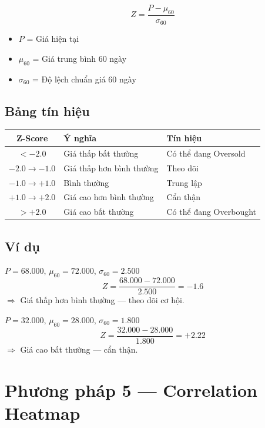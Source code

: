 \documentclass[12pt,a4paper]{article}
\begin{document}
\begin{equation}
\boxed{
  Z = \frac{P - \mu_{60}}{\sigma_{60}}
}
\end{equation}

\begin{itemize}[nosep]
  \item $P$ = Giá hiện tại
  \item $\mu_{60}$ = Giá trung bình 60 ngày
  \item $\sigma_{60}$ = Độ lệch chuẩn giá 60 ngày
\end{itemize}

\subsection{Bảng tín hiệu}

\begin{tabularx}{\textwidth}{c l l}
\toprule
\textbf{Z-Score} & \textbf{Ý nghĩa} & \textbf{Tín hiệu} \\
\midrule
$< -2.0$ & Giá thấp bất thường & Có thể đang Oversold \\
$-2.0 \to -1.0$ & Giá thấp hơn bình thường & Theo dõi \\
$-1.0 \to +1.0$ & Bình thường & Trung lập \\
$+1.0 \to +2.0$ & Giá cao hơn bình thường & Cẩn thận \\
$> +2.0$ & Giá cao bất thường & Có thể đang Overbought \\
\bottomrule
\end{tabularx}

\subsection{Ví dụ}

\begin{examplebox}[VNM]
$P = 68.000$, $\mu_{60} = 72.000$, $\sigma_{60} = 2.500$
$$Z = \frac{68.000 - 72.000}{2.500} = -1.6$$
$\Rightarrow$ Giá thấp hơn bình thường — theo dõi cơ hội.
\end{examplebox}

\begin{examplebox}[HPG]
$P = 32.000$, $\mu_{60} = 28.000$, $\sigma_{60} = 1.800$
$$Z = \frac{32.000 - 28.000}{1.800} = +2.22$$
$\Rightarrow$ Giá cao bất thường — cẩn thận.
\end{examplebox}

\newpage
\section{Phương pháp 5 — Correlation Heatmap}
\end{document}
